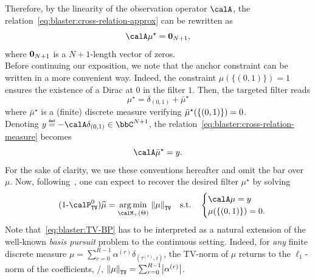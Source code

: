 \mynewline
Therefore, by the linearity of the observation operator $\opObs$, the relation~\cref{eq:blaster:cross-relation-approx} can be rewritten as
\begin{equation}
    \label{eq:blaster:cross-relation-measure}
    \opObs\mu^\star = \zeroVect_{N+1}
    ,
\end{equation}
where $\mathbf{0}_{N+1}$ is a $N+1$-length vector of zeros.
\\Before continuing our exposition, we note that the anchor constraint can be written in a more convenient way.
Indeed, the constraint $\mu(\{(0, 1)\})=1$ ensures the existence of a Dirac at $0$ in the filter $1$.
Then, the targeted filter reads
\begin{equation}
    \mu^\star = \delta_{(0, 1)} + \bar{\mu}^\star
\end{equation}
where $\bar{\mu}^\star$ is a (finite) discrete measure verifying  $\bar{\mu}^\star\kparen{\{(0, 1)\}} = 0$.
\\Denoting $y\eqdef-\opObs\delta_{(0, 1)}\in\bbC^{N+1}$, the relation~\cref{eq:blaster:cross-relation-measure} becomes
\begin{equation}
    \label{eq:blaster:cross-relation-measure-and-obs}
    \opObs\bar{\mu}^\star = y
    .
\end{equation}
For the sake of clarity, we use these conventions hereafter and omit the bar over $\mu$.
Now, following~, one can expect to recover the desired filter $\mu^\star$ by solving
\begin{equation}
    \stepcounter{equation}
    \tag{\theequation-$\calP^0_\mathtt{TV}$}
    \label{eq:blaster:TV-BP}
    \widehat{\mu}
    =
    \kargmin_{\posDisRadonMeasure}
    \;
    \normTV{
        \mu
    }
    \quad
    \text{s.t.}
    \quad
    \begin{cases}
        \opObs\mu
        = y \\
        \mu(\{(0, 1)\}) = 0.
    \end{cases}
\end{equation}
Note that~\eqref{eq:blaster:TV-BP} has to be interpreted as a natural extension of the well-known \emph{basis pursuit} problem to the continuous setting.
Indeed, for \emph{any} finite discrete measure $\mu = \sum_{r=0}^{R-1} \alpha^{(r)}\delta_{(\tau^{(r)}, i)}$, the TV-norm of $\mu$ returns to the $\ell_1$-norm of the coefficients, \ie/, $\kvvbar{\mu}_{\mathtt{TV}} = \sum_{\idxEch=0}^{\numEchs-1} \kvbar{\alpha^{(r)}}$.

